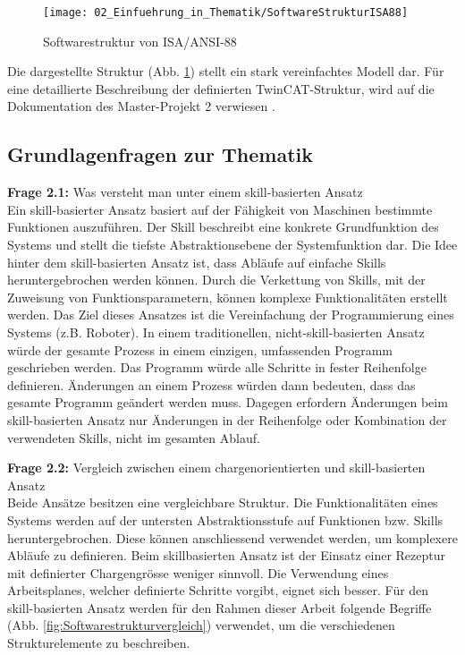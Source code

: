 		\begin{figure}[h!]
			\centering
			\texttt{[image: 02\_Einfuehrung\_in\_Thematik/SoftwareStrukturISA88]}
			\captionsetup{justification=centering}
			\caption{Softwarestruktur von ISA/ANSI-88}
			\label{fig:Softwarestruktur_ISA88}
		\end{figure}
		
		Die dargestellte Struktur (Abb. \ref{fig:Softwarestruktur_ISA88}) stellt ein stark vereinfachtes Modell dar. Für eine detaillierte Beschreibung der definierten TwinCAT-Struktur, wird auf die Dokumentation des Master-Projekt 2 verwiesen \cite{Referenzprojekt}.
		
	\vspace{3mm}
	
	\subsection{Grundlagenfragen zur Thematik} \label{Grundlagenfragen für Thematik}
	
	\textbf{Frage 2.1:} Was versteht man unter einem skill-basierten Ansatz \vspace{2mm} 
	\\
		Ein skill-basierter Ansatz basiert auf der Fähigkeit von Maschinen bestimmte Funktionen auszuführen. Der Skill beschreibt eine konkrete Grundfunktion des Systems und stellt die tiefste Abstraktionsebene der Systemfunktion dar. Die Idee hinter dem skill-basierten Ansatz ist, dass Abläufe auf einfache Skills heruntergebrochen werden können. Durch die Verkettung von Skills, mit der Zuweisung von Funktionsparametern, können komplexe Funktionalitäten erstellt werden. Das Ziel dieses Ansatzes ist die Vereinfachung der Programmierung eines Systems (z.B. Roboter). In einem traditionellen, nicht-skill-basierten Ansatz würde der gesamte Prozess in einem einzigen, umfassenden Programm geschrieben werden. Das Programm würde alle Schritte in fester Reihenfolge definieren. Änderungen an einem Prozess würden dann bedeuten, dass das gesamte Programm geändert werden muss. Dagegen erfordern Änderungen beim skill-basierten Ansatz nur Änderungen in der Reihenfolge oder Kombination der verwendeten Skills, nicht im gesamten Ablauf.
	\vspace{3mm}
	
	\textbf{Frage 2.2:} Vergleich zwischen einem chargenorientierten und skill-basierten Ansatz \vspace{2mm} 
	\\
		Beide Ansätze besitzen eine vergleichbare Struktur. Die Funktionalitäten eines Systems werden auf der untersten Abstraktionsstufe auf Funktionen bzw. Skills heruntergebrochen. Diese können anschliessend verwendet werden, um komplexere Abläufe zu definieren. Beim skillbasierten Ansatz ist der Einsatz einer Rezeptur mit definierter Chargengrösse weniger sinnvoll. Die Verwendung eines Arbeitsplanes, welcher definierte Schritte vorgibt, eignet sich besser.
		Für den skill-basierten Ansatz werden für den Rahmen dieser Arbeit folgende Begriffe (Abb. \ref{fig:Softwarestrukturvergleich}) verwendet, um die verschiedenen Strukturelemente zu beschreiben. 
	
